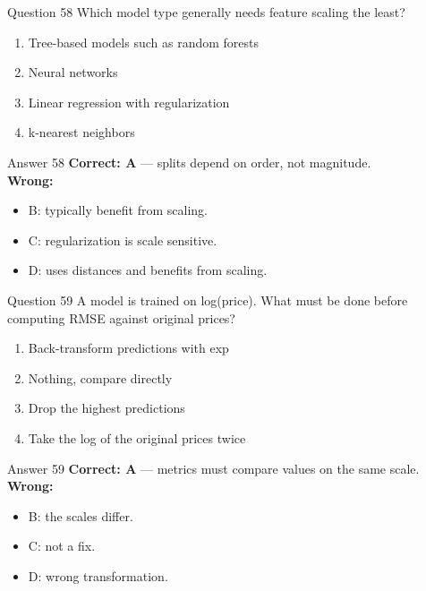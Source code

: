 \documentclass[aspectratio=169,11pt]{beamer}
\begin{document}
	\begin{frame}{Question 58}
		Which model type generally needs feature scaling the least?
		\begin{enumerate}[label=\Alph*.]
			\item Tree-based models such as random forests
			\item Neural networks
			\item Linear regression with regularization
			\item k-nearest neighbors
		\end{enumerate}
	\end{frame}
	\begin{frame}{Answer 58}
		\textbf{Correct: A} --- splits depend on order, not magnitude.\\
		\vspace{0.5em}
		\textbf{Wrong:}
		\begin{itemize}
			\item B: typically benefit from scaling.
			\item C: regularization is scale sensitive.
			\item D: uses distances and benefits from scaling.
		\end{itemize}
	\end{frame}
	
	\begin{frame}{Question 59}
		A model is trained on log(price). What must be done before computing RMSE against original prices?
		\begin{enumerate}[label=\Alph*.]
			\item Back-transform predictions with exp
			\item Nothing, compare directly
			\item Drop the highest predictions
			\item Take the log of the original prices twice
		\end{enumerate}
	\end{frame}
	\begin{frame}{Answer 59}
		\textbf{Correct: A} --- metrics must compare values on the same scale.\\
		\vspace{0.5em}
		\textbf{Wrong:}
		\begin{itemize}
			\item B: the scales differ.
			\item C: not a fix.
			\item D: wrong transformation.
		\end{itemize}
	\end{frame}
	
\end{document}
